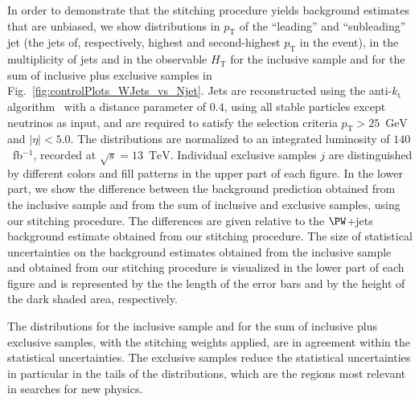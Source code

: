 \documentclass[twocolumn,epjc3]{svjour3}
\newcommand{\pT}{\ensuremath{p_{\textrm{T}}}\xspace}
\newcommand{\kt}{\ensuremath{k_{\textrm{t}}}\xspace}
\newcommand{\HT}{\ensuremath{H_{\mathrm{T}}}\xspace}
\newcommand{\GeV}{\ensuremath{\textrm{GeV}}\xspace}
\newcommand{\TeV}{\ensuremath{\textrm{TeV}}\xspace}
\begin{document}
In order to demonstrate that the stitching procedure yields background estimates that are unbiased,
we show distributions in $\pT$ of the ``leading'' and ``subleading'' jet (the jets of, respectively, highest and second-highest $\pT$ in the event),
in the multiplicity of jets and in the observable $\HT$ 
for the inclusive sample and for the sum of inclusive plus exclusive samples in Fig.~\ref{fig:controlPlots_WJets_vs_Njet}.
Jets are reconstructed using the anti-\kt algorithm~\cite{Cacciari:2008gp,Cacciari:2011ma} with a distance parameter of $0.4$,
using all stable particles except neutrinos as input, and are required to satisfy the selection criteria $\pT > 25$~\GeV and $\vert\eta\vert < 5.0$.
The distributions are normalized to an integrated luminosity of $140$~fb$^{-1}$, recorded at $\sqrt{s}=13$~\TeV.
Individual exclusive samples $j$ are distinguished by different colors and fill patterns in the upper part of each figure.
In the lower part, we show the difference between the background prediction obtained from the inclusive sample and from the sum of inclusive and exclusive samples,
using our stitching procedure.
The differences are given relative to the $\PW$+jets background estimate obtained from our stitching procedure.
The size of statistical uncertainties on the background estimates obtained from the inclusive sample and obtained from our stitching procedure
is visualized in the lower part of each figure and is represented by the the length of the error bars and by the height of the dark shaded area, respectively.

The distributions for the inclusive sample and for the sum of inclusive plus exclusive samples, with the stitching weights applied, are in agreement within the statistical uncertainties.
The exclusive samples reduce the statistical uncertainties in particular in the tails of the distributions,
which are the regions most relevant in searches for new physics.
\end{document}
